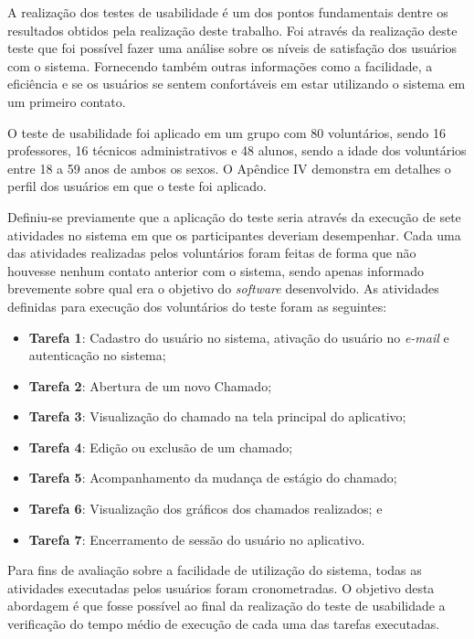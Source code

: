 \noindent A realização dos testes de usabilidade é um dos pontos fundamentais dentre os resultados obtidos pela realização deste trabalho. Foi através da realização deste teste que foi possível fazer uma análise sobre os níveis de satisfação dos usuários com o sistema. Fornecendo também outras informações como a facilidade, a eficiência e se os usuários se sentem confortáveis em estar utilizando o sistema em um primeiro contato.

O teste de usabilidade foi aplicado em um grupo com 80 voluntários, sendo 16 professores, 16 técnicos administrativos e 48 alunos, sendo a idade dos voluntários entre 18 a 59 anos de ambos os sexos. O Apêndice IV demonstra em detalhes o perfil dos usuários em que o teste foi aplicado.

Definiu-se previamente que a aplicação do teste seria através da execução de sete atividades no sistema em que os participantes deveriam desempenhar. Cada uma das atividades realizadas pelos voluntários foram feitas de forma que não houvesse nenhum contato anterior com o sistema, sendo apenas informado brevemente sobre qual era o objetivo do \textit{software} desenvolvido. As atividades definidas para execução dos voluntários do teste foram as seguintes:

\begin{itemize}
    \item \textbf{Tarefa 1}: Cadastro do usuário no sistema, ativação do usuário no \textit{e-mail} e autenticação no sistema;
    \item \textbf{Tarefa 2}: Abertura de um novo Chamado;
    \item \textbf{Tarefa 3}: Visualização do chamado na tela principal do aplicativo;
    \item \textbf{Tarefa 4}: Edição ou exclusão de um chamado;
    \item \textbf{Tarefa 5}: Acompanhamento da mudança de estágio do chamado;
    \item \textbf{Tarefa 6}: Visualização dos gráficos dos chamados realizados; e 
    \item \textbf{Tarefa 7}: Encerramento de sessão do usuário no aplicativo.
\end{itemize}

Para fins de avaliação sobre a facilidade de utilização do sistema, todas as atividades executadas pelos usuários foram cronometradas. O objetivo desta abordagem é que fosse possível ao final da realização do teste de usabilidade a verificação do tempo médio de execução de cada uma das tarefas executadas. 

